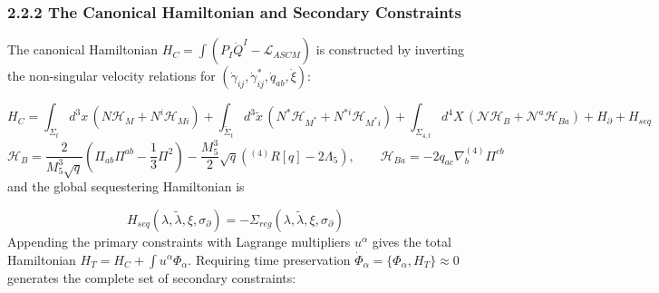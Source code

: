\documentclass[aps,prd,onecolumn,superscriptaddress,nofootinbib,longbibliography,10pt]{revtex4-2}
\begin{document}
  
\subsubsection*{2.2.2 The Canonical Hamiltonian and Secondary Constraints}

  The canonical Hamiltonian \(H_C = \int \left(P_I\dot{Q}^I - \mathcal{L}_{ASCM}\right)\) is constructed by inverting the non-singular velocity relations for \((\dot{\gamma}_{ij}, \dot{\gamma}^*_{ij}, \dot{q}_{ab}, \dot{\xi})\):


  \[ H_C = \int_{\Sigma_t} d^3x\,(N\mathcal{H}_M + N^i\mathcal{H}_{Mi}) + \int_{\tilde{\Sigma}_t} d^3\tilde{x}\,(N^*\mathcal{H}_{M^*} + N^{*i}\mathcal{H}_{M^*i}) + \int_{\Sigma_{4,t}} d^4X\,(\mathcal{N}\mathcal{H}_B + \mathcal{N}^a\mathcal{H}_{Ba}) + H_\partial + H_{seq} \]
\[\mathcal{H}_B = \frac{2}{M_5^3\sqrt{q}}\left(\Pi_{ab}\Pi^{ab} - \frac{1}{3}\Pi^2\right) - \frac{M_5^3}{2}\sqrt{q}\left(^{(4)}R[q] - 2\Lambda_5\right), \qquad \mathcal{H}_{Ba} = -2q_{ac}\nabla^{(4)}_b\Pi^{cb}\]
and the global sequestering Hamiltonian is


  \[ H_{seq}(\lambda,\tilde{\lambda},\xi,\sigma_\partial) = -\Sigma_{reg}(\lambda,\tilde{\lambda},\xi,\sigma_\partial) \]
  Appending the primary constraints with Lagrange multipliers \(u^\alpha\) gives the total Hamiltonian \(H_T = H_C + \int u^\alpha \Phi_\alpha\). Requiring time preservation \(\dot{\Phi}_\alpha = \{\Phi_\alpha, H_T\} \approx 0\) generates the complete set of secondary constraints:
\end{document}
